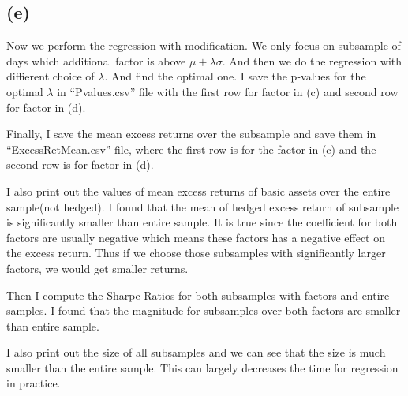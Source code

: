 \documentclass[letterpaper,11pt]{article}
\begin{document}
\begin{spacing}{1.2}
\subsection*{(e)}
Now we perform the regression with modification. We only focus on subsample of days which additional factor is above $\mu + \lambda\sigma$. And then we do the regression with diffierent choice of $\lambda$. And find the optimal one. I save the p-values for the optimal $\lambda$ in ``Pvalues.csv'' file with the first row for factor in (c) and second row for factor in (d).

Finally, I save the mean excess returns over the subsample and save them in ``ExcessRetMean.csv'' file, where the first row is for the factor in (c) and the second row is for factor in (d).

I also print out the values of mean excess returns of basic assets over the entire sample(not hedged). I found that the mean of hedged excess return of subsample is significantly smaller than entire sample. It is true since the coefficient for both factors are usually negative which means these factors has a negative effect on the excess return. Thus if we choose those subsamples with significantly larger factors, we would get smaller returns.

Then I compute the Sharpe Ratios for both subsamples with factors and entire samples. I found that the magnitude for subsamples over both factors are smaller than entire sample.

I also print out the size of all subsamples and we can see that the size is much smaller than the entire sample. This can largely decreases the time for regression in practice.

\end{spacing}
\end{document}
